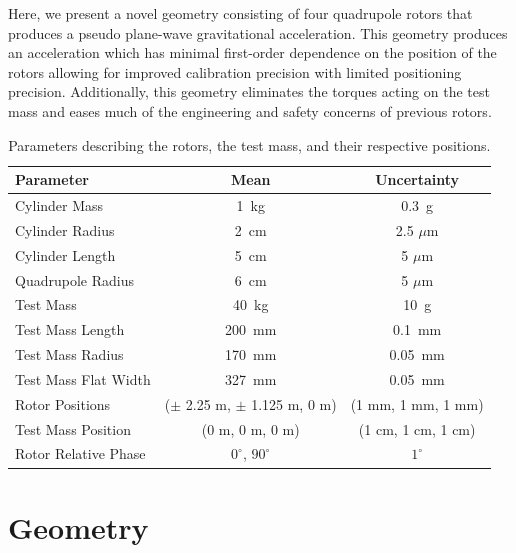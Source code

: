\documentclass[superscriptaddress, twocolumn, prd]{revtex4-1}
\begin{document}
Here, we present a novel geometry consisting of four quadrupole rotors that produces a pseudo plane-wave gravitational acceleration. This geometry produces an acceleration which has minimal first-order dependence on the position of the rotors allowing for improved calibration precision with limited positioning precision. Additionally, this geometry eliminates the torques acting on the test mass and eases much of the engineering and safety concerns of previous rotors.

\begin{widetext}
\begingroup
\setlength{\tabcolsep}{10pt} %
\renewcommand{\arraystretch}{1.5} %

\begin{table}[h!]
\begin{center}
\begin{tabular}{ |l|c|c| }
\hline
 Parameter & Mean & Uncertainty \\
 \hline
Cylinder Mass & 1~kg & 0.3~g \\
Cylinder Radius & 2~cm & 2.5 $\mu$m \\
Cylinder Length & 5~cm & 5 $\mu$m \\
Quadrupole Radius & 6~cm & 5 $\mu$m \\
Test Mass & 40~kg & 10~g \\
Test Mass Length & 200~mm & 0.1~mm\\
Test Mass Radius & 170~mm & 0.05~mm\\
Test Mass Flat Width & 327~mm & 0.05~mm\\
Rotor Positions & ($\pm$ 2.25 m, $\pm$ 1.125 m, 0 m) & (1 mm, 1 mm, 1 mm) \\
Test Mass Position & (0 m, 0 m, 0 m) & (1 cm, 1 cm, 1 cm) \\
Rotor Relative Phase & $0^\circ$, $90^\circ$ & $1^\circ$ \\
 \hline

 \end{tabular}
 \caption{Parameters describing the rotors, the test mass, and their respective positions.}\label{param}
 \end{center}

\end{table}
\endgroup
\end{widetext}

\section{Geometry}
\end{document}
